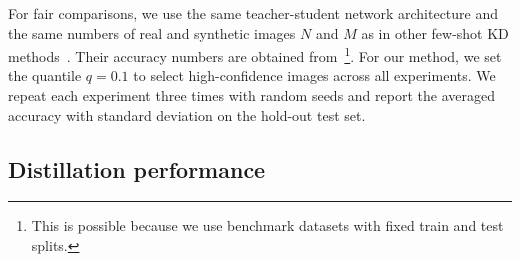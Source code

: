 \begin{foldable}
  For fair comparisons, we use the same teacher-student network architecture and the same numbers of real and synthetic images $N$ and $M$ as in other few-shot KD methods~\cite{kimura2018few,wang2020neural,nguyen2022black}.
  Their accuracy numbers are obtained from~\cite{nguyen2022black}\footnote{This is possible because we use benchmark datasets with fixed train and test splits.}.
  For our method, we set the quantile $q = 0.1$ to select high-confidence images across all experiments.
  We repeat each experiment three times with random seeds and report the averaged accuracy with standard deviation on the hold-out test set.
\end{foldable}

\subsection{Distillation performance}

